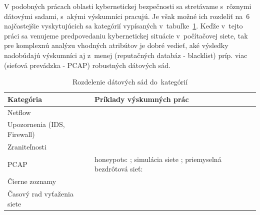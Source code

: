 \documentclass[thesismargins, thesislinespacing, openright, upjsfrontpage]{rnthesis}
\begin{document}

V podobných prácach oblasti kybernetickej bezpečnosti sa stretávame s~rôznymi dátovými sadami, s~akými výskumníci pracujú. Je však možné ich rozdeliť na~6 najčastejšie vyskytujúcich sa kategórií vypísaných v~tabuľke~\ref{tab:c1_datasets}. Keďže v~tejto práci sa venujeme predpovedaniu kybernetickej situácie v~počítačovej siete, tak pre komplexnú analýzu vhodných atribútov je dobré vedieť, aké výsledky nadobúdajú výskumníci aj z~menej (reputačných databáz - blacklist) príp. viac (sieťová prevádzka - PCAP) robustných dátových sád.

\begin{table}[]
    \centering
    \begin{tabular}{ | p{5cm} | p{9cm} | }
         \hline \textbf{Kategória} & \textbf{Príklady výskumných prác} \\
         \hline
         \hline Netflow & \cite{zang2019adaptive,fang2019deep,millar2019using,bakhshi2015user,jakalan2015profiling,marchette1999statistical,bernaille2006traffic,jirsik2020cyber} \\
         \hline Upozornenia \newline (IDS, Firewall) & \cite{granat2019big,werner2017time,shin2013advanced,ramaki2015real,soldo2011blacklisting} \\
         \hline Zraniteľnosti & \cite{tang2016exploiting,condon2008analysis,roumani2015time,tang2018disclosure,tang2017big,pokhrel2017cybersecurity} \\
         \hline PCAP & honeypots: \cite{zhan2015predicting,berti2017profiling,hammerschmidt2016efficient}; \newline simulácia siete \cite{jiang2004detecting}; \newline priemyselná bezdrôtová sieť: \cite{wei2012intrusion}  \\
         \hline Čierne zoznamy & \cite{liu2015cloudy} \\
         \hline Časový rad vyťaženia siete & \cite{cortez2012multi,hasegawa2001applications,papagiannaki2005long,sang2002predictability,wang2008internet} \\
         \hline
    \end{tabular}
    \caption{Rozdelenie dátových sád do~kategórií}
    \label{tab:c1_datasets}
\end{table}
\end{document}
